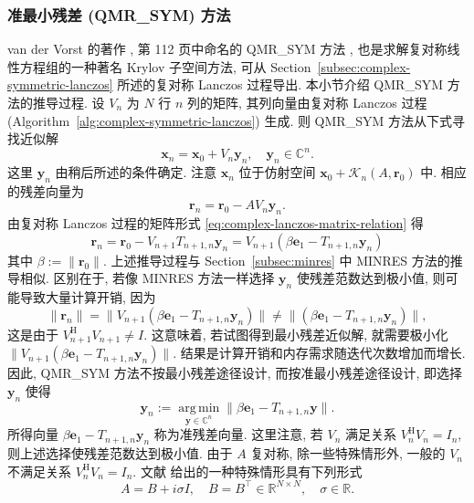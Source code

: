 \subsubsection{{准最小残差 (QMR\_SYM) 方法}}\label{subsec:qmr-sym}
{van der Vorst 的著作 , 第 112 页中命名的 QMR\_SYM 方法 , 也是求解复对称线性方程组的一种著名 Krylov 子空间方法, 可从 Section\ \ref{subsec:complex-symmetric-lanczos} 所述的复对称 Lanczos 过程导出.}
{本小节介绍 QMR\_SYM 方法的推导过程. 设 $V_n$ 为 $N$ 行 $n$ 列的矩阵, 其列向量由复对称 Lanczos 过程 (Algorithm\ \ref{alg:complex-symmetric-lanczos}) 生成. 则 QMR\_SYM 方法从下式寻找近似解}
\begin{equation}\label{eq:qmr-sym-affine-solution}\bm x_n=\bm x_0+V_n\bm y_n,\quad\bm y_n\in\mathbb C^n.\end{equation}
{这里 $\bm y_n$ 由稍后所述的条件确定. 注意 $\bm x_n$ 位于仿射空间 $\bm x_0+\mathcal K_n(A,\bm r_0)$ 中. 相应的残差向量为}
\[\bm r_n=\bm r_0-AV_n\bm y_n.\]
{由复对称 Lanczos 过程的矩阵形式 \eqref{eq:complex-lanczos-matrix-relation} 得}
\[\bm r_n=\bm r_0-V_{n+1}T_{n+1,n}\bm y_n=V_{n+1}(\beta\bm e_1-T_{n+1,n}\bm y_n)\]
{其中 $\beta:=\|\bm r_0\|$. 上述推导过程与 Section\ \ref{subsec:minres} 中 MINRES 方法的推导相似. 区别在于, 若像 MINRES 方法一样选择 $\bm y_n$ 使残差范数达到极小值, 则可能导致大量计算开销, 因为}
\begin{equation}\label{eq:qmr-sym-residual-norm-distinction}
\|\bm r_n\|=\|V_{n+1}(\beta\bm e_1-T_{n+1,n}\bm y_n)\|\ne\|(\beta\bm e_1-T_{n+1,n}\bm y_n)\|,
\end{equation}
{这是由于 $V_{n+1}^{\mathrm H}V_{n+1}\ne I$. 这意味着, 若试图得到最小残差近似解, 就需要极小化 $\|V_{n+1}(\beta\bm e_1-T_{n+1,n}\bm y_n)\|$. 结果是计算开销和内存需求随迭代次数增加而增长.}
{因此, QMR\_SYM 方法不按最小残差途径设计, 而按准最小残差途径设计, 即选择 $\bm y_n$ 使得}
\begin{equation}\label{eq:qmr-sym-projected-minimization}\bm y_n:=\operatorname*{arg\,min}_{\bm y\in\mathbb C^n}\|\beta\bm e_1-T_{n+1,n}\bm y\|.\end{equation}
{所得向量 $\beta\bm e_1-T_{n+1,n}\bm y_n$ 称为准残差向量. 这里注意, 若 $V_n$ 满足关系 $V_n^{\mathrm H}V_n=I_n$, 则上述选择使残差范数达到极小值. 由于 $A$ 复对称, 除一些特殊情形外, 一般的 $V_n$ 不满足关系 $V_n^{\mathrm H}V_n=I_n$. 文献  给出的一种特殊情形具有下列形式}
\[A=B+i\sigma I,\quad B=B^{\top}\in\mathbb R^{N\times N},\quad\sigma\in\mathbb R.\]
